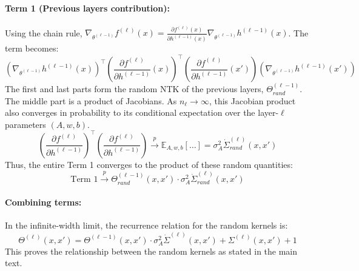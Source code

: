 \documentclass[12pt]{article}
\begin{document}
\paragraph{Term 1 (Previous layers contribution):}
Using the chain rule, $\nabla_{\theta^{(\ell-1)}} f^{(\ell)}(x) = \frac{\partial f^{(\ell)}(x)}{\partial h^{(\ell-1)}(x)} \nabla_{\theta^{(\ell-1)}} h^{(\ell-1)}(x)$. The term becomes:
\[ (\nabla_{\theta^{(\ell-1)}} h^{(\ell-1)}(x))^\top \left(\frac{\partial f^{(\ell)}}{\partial h^{(\ell-1)}}(x)\right)^\top \left(\frac{\partial f^{(\ell)}}{\partial h^{(\ell-1)}}(x')\right) (\nabla_{\theta^{(\ell-1)}} h^{(\ell-1)}(x')) \]
The first and last parts form the random NTK of the previous layers, $\Theta^{(\ell-1)}_{rand}$. The middle part is a product of Jacobians. As $n_\ell \to \infty$, this Jacobian product also converges in probability to its conditional expectation over the layer-$\ell$ parameters $(A, w, b)$.
\[ \left(\frac{\partial f^{(\ell)}}{\partial h^{(\ell-1)}}\right)^\top \left(\frac{\partial f^{(\ell)}}{\partial h^{(\ell-1)}}\right) \xrightarrow{p} \mathbb{E}_{A,w,b} \left[ \dots \right] = \sigma_A^2 \dot{\Sigma}^{(\ell)}_{rand}(x, x') \]
Thus, the entire Term 1 converges to the product of these random quantities:
\[ \text{Term 1} \xrightarrow{p} \Theta^{(\ell-1)}_{rand}(x, x') \cdot \sigma_A^2 \dot{\Sigma}^{(\ell)}_{rand}(x, x') \]

\paragraph{Combining terms:}
In the infinite-width limit, the recurrence relation for the random kernels is:
\[ \Theta^{(\ell)}(x, x') = \Theta^{(\ell-1)}(x, x') \cdot \sigma_A^2 \dot{\Sigma}^{(\ell)}(x, x') + \Sigma^{(\ell)}(x, x') + 1\]
This proves the relationship between the random kernels as stated in the main text.
\end{document}
